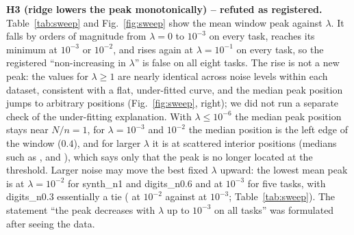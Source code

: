 \begin{table}[t]\centering\small
\caption{MinNorm peak height against label noise. \texttt{pos}: median peak $N/n$; $\log_{10}$ peak: mean $\pm$ sd; mean and median of the peak test MSE over seeds; best: mean over seeds of the minimum over the grid of the test MSE.}\label{tab:noise}

\end{table}

\textbf{H3 (ridge lowers the peak monotonically) -- refuted as registered.} Table~\ref{tab:sweep} and Fig.~\ref{fig:sweep} show the mean window peak against $\lambda$. It falls by orders of magnitude from $\lambda=0$ to $10^{-3}$ on every task, reaches its minimum at $10^{-3}$ or $10^{-2}$, and rises again at $\lambda=10^{-1}$ on every task, so the registered ``non-increasing in $\lambda$'' is false on all eight tasks. The rise is not a new peak: the values for $\lambda\ge1$ are nearly identical across noise levels within each dataset, consistent with a flat, under-fitted curve, and the median peak position jumps to arbitrary positions (Fig.~\ref{fig:sweep}, right); we did not run a separate check of the under-fitting explanation. With $\lambda\le10^{-6}$ the median peak position stays near $N/n=1$, for $\lambda=10^{-3}$ and $10^{-2}$ the median position is the left edge of the window ($0.4$), and for larger $\lambda$ it is at scattered interior positions (medians such as ,  and ), which says only that the peak is no longer located at the threshold. Larger noise may move the best fixed $\lambda$ upward: the lowest mean peak is at $\lambda=10^{-2}$ for synth\_n1 and digits\_n0.6 and at $10^{-3}$ for five tasks, with digits\_n0.3 essentially a tie ( at $10^{-2}$ against  at $10^{-3}$; Table~\ref{tab:sweep}). The statement ``the peak decreases with $\lambda$ up to $10^{-3}$ on all tasks'' was formulated after seeing the data.

\begin{table}[t]\centering\small
\caption{Mean peak test MSE (window $0.4\le N/n\le4$) of fixed-ridge regression against $\lambda$ ($0$ = MinNorm, $10^{-2}$ = the FixedRidge of Table~\ref{tab:main}).}\label{tab:sweep}

\end{table}

